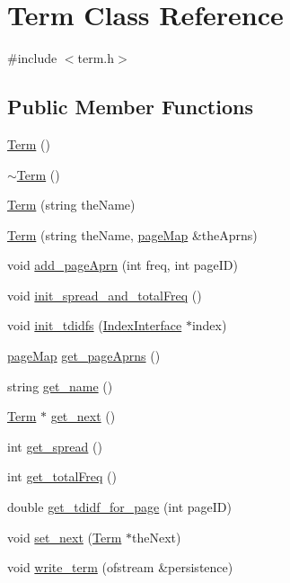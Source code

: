 \hypertarget{class_term}{}\section{Term Class Reference}
\label{class_term}


{\ttfamily \#include $<$term.\+h$>$}

\subsection*{Public Member Functions}
\begin{DoxyCompactItemize}
\item 
\hyperlink{class_term_a6943005db5b7e5ca84afcb54a5862d42}{Term} ()
\item 
\hyperlink{class_term_af684aafab11ec6442aed0866b4973afc}{$\sim$\+Term} ()
\item 
\hyperlink{class_term_aa67dd812957ad124bb6306960dd8709c}{Term} (string the\+Name)
\item 
\hyperlink{class_term_ae97a04d16b87ac6bebe1057481f962c8}{Term} (string the\+Name, \hyperlink{avltreeinterface_8h_afdba5c4962a1c0abdda6ca3e414a9a45}{page\+Map} \&the\+Aprns)
\item 
void \hyperlink{class_term_a30b1bfc816bf5a495937476bf56fd567}{add\+\_\+page\+Aprn} (int freq, int page\+I\+D)
\item 
void \hyperlink{class_term_a2cd7415c99700d9b038517207e1d2738}{init\+\_\+spread\+\_\+and\+\_\+total\+Freq} ()
\item 
void \hyperlink{class_term_a9b3336df22649f7d1bef558c59209d3b}{init\+\_\+tdidfs} (\hyperlink{class_index_interface}{Index\+Interface} $\ast$index)
\item 
\hyperlink{avltreeinterface_8h_afdba5c4962a1c0abdda6ca3e414a9a45}{page\+Map} \hyperlink{class_term_a3f33daab2cf50371f191c75656aabb66}{get\+\_\+page\+Aprns} ()
\item 
string \hyperlink{class_term_aba11aacf87334a460aae98148699dc46}{get\+\_\+name} ()
\item 
\hyperlink{class_term}{Term} $\ast$ \hyperlink{class_term_a94ed9995429f2c6fd6d0b9556cc61ff7}{get\+\_\+next} ()
\item 
int \hyperlink{class_term_a3b708fc85a3b272d67558600711aca05}{get\+\_\+spread} ()
\item 
int \hyperlink{class_term_a41a8474eb94c1e2e951d23fe164aecd6}{get\+\_\+total\+Freq} ()
\item 
double \hyperlink{class_term_aae2effee196de73962a33d85aeca914c}{get\+\_\+tdidf\+\_\+for\+\_\+page} (int page\+I\+D)
\item 
void \hyperlink{class_term_a2f963514bfacc52e654c94793e25e3d4}{set\+\_\+next} (\hyperlink{class_term}{Term} $\ast$the\+Next)
\item 
void \hyperlink{class_term_ae0e0bd5c7411fa03aeb2c92464dd921b}{write\+\_\+term} (ofstream \&persistence)
\end{DoxyCompactItemize}
